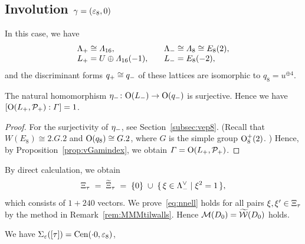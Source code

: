 \documentclass{amsart} %
\begin{document}
\subsection{Involution $\gamma=(\varepsilon_8, 0)$}\label{subsec:walls8}
%
In this case, we have
\[
\begin{array}{ll}
\Lambda_{+}\cong \varLambda_{16}, \quad &\Lambda_{-}\cong \varLambda_{8}\cong E_8(2),\\
L_{+}= U\oplus \varLambda_{16}(-1), \quad &L_{-}= E_8(-2),
\end{array}
\]
%
and the discriminant forms $q_{+}\cong q_{-}$ of these lattices are 
isomorphic to $q_8=u^{\oplus 4}$.
%
\begin{proposition}\label{prop:indexvep8}
The natural homomorphism ${\eta}_{-}\colon \mathord{\mathrm{O}}(L_{-})\to \mathord{\mathrm{O}}(q_{-})$ is surjective.
Hence we have $[\mathord{\mathrm{O}}(L_{+}, \mathord{\mathcal{P}}_{+}): \varGamma]=1$.
\end{proposition}
%
\begin{proof}
For the surjectivity of ${\eta}_{-}$, see Section~\ref{subsec:vep8}.
(Recall that $W(E_8)\cong2.G.2$ and $\mathord{\mathrm{O}}(q_8)\cong G.2$, where $G$ is the simple group $\mathord{\mathrm{O}}^+_8(2)$. )
Hence, by Proposition~\ref{prop:vGamindex}, we obtain $\varGamma=\mathord{\mathrm{O}}(L_{+}, \mathord{\mathcal{P}}_{+})$.
\end{proof}
%
By direct calculation, we obtain 
\[
\Xi_{\tau}\;=\;\widetilde{\Xi}_{\tau} \; =\; \{0\}\;\cup\;\{\,{\xi\in \Lambda_{-}^{\vee}}\mid {\xi^2=1} \,\},
\]
which consists of $1+240$ vectors.
We prove~\eqref{eq:nnell} holds for all pairs $\xi, \xi^{\prime}\in \Xi_{\tau}$
by the method in Remark~\ref{rem:MMMtilwalls}.
Hence 
$\mathord{\mathcal{M}}(D_0)=\widetilde{\mathord{\mathcal{W}}}(D_0)$ holds.
%
%
%
%
%
\par
%
We have $\Sigma_{\varepsilon}([\tau])=\mathrm{Cen}(\cdot 0, \varepsilon_{8})$,
\end{document}
